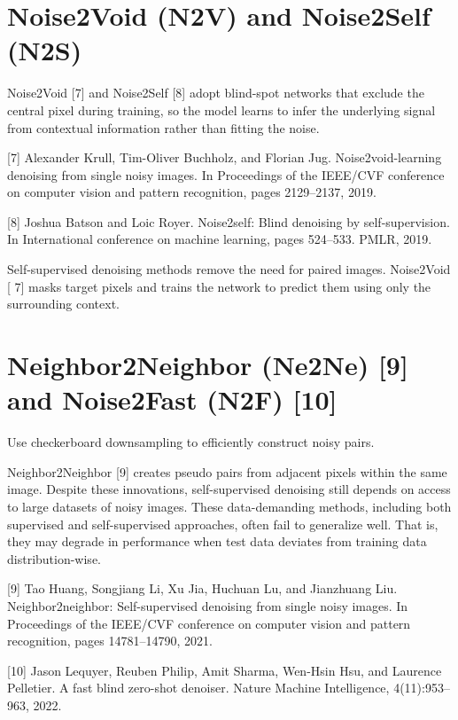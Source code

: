 \section{Noise2Void (N2V) and Noise2Self (N2S)}
Noise2Void [7] and Noise2Self [8] adopt blind-spot networks that
exclude the central pixel during training, so the model learns to
infer the underlying signal from contextual information rather than
fitting the noise. %

[7] Alexander Krull, Tim-Oliver Buchholz, and Florian Jug. Noise2void-learning denoising from single noisy images.
In Proceedings of the IEEE/CVF conference on computer vision and pattern recognition, pages 2129–2137, 2019.


[8] Joshua Batson and Loic Royer. Noise2self: Blind denoising by self-supervision. In International conference on
machine learning, pages 524–533. PMLR, 2019.

Self-supervised denoising methods remove the need for paired
images. Noise2Void [ 7] masks target pixels and trains the network to
predict them using only the surrounding context. %

\section{Neighbor2Neighbor (Ne2Ne) [9] and Noise2Fast (N2F) [10]}
Use checkerboard downsampling to efficiently construct noisy pairs.

Neighbor2Neighbor [9] creates pseudo pairs from adjacent pixels
within the same image. Despite these innovations, self-supervised
denoising still depends on access to large datasets of noisy
images. These data-demanding methods, including both supervised and
self-supervised approaches, often fail to generalize well. That is,
they may degrade in performance when test data deviates from training
data distribution-wise. %

[9] Tao Huang, Songjiang Li, Xu Jia, Huchuan Lu, and Jianzhuang Liu. Neighbor2neighbor: Self-supervised
denoising from single noisy images. In Proceedings of the IEEE/CVF conference on computer vision and pattern
recognition, pages 14781–14790, 2021.

[10] Jason Lequyer, Reuben Philip, Amit Sharma, Wen-Hsin Hsu, and Laurence Pelletier. A fast blind zero-shot
denoiser. Nature Machine Intelligence, 4(11):953–963, 2022.

